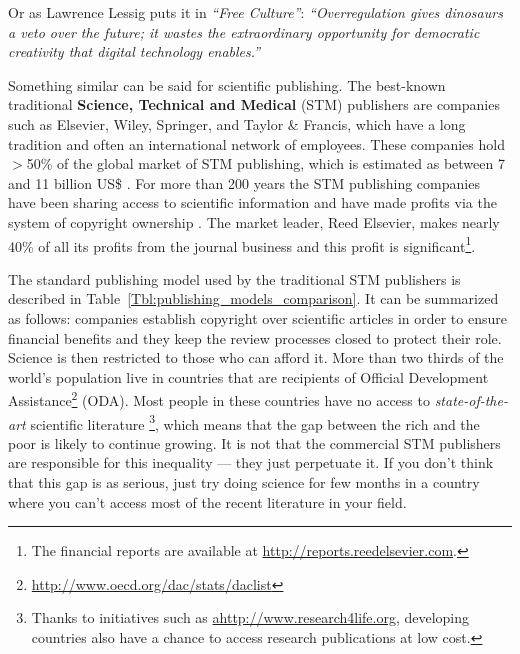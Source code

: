 \documentclass[graybox,envcountchap,sectrefs,UStrade]{svmono}
\begin{document}
Or as Lawrence Lessig puts it in \emph{``Free Culture''}: \emph{``Overregulation gives dinosaurs a veto over the future; it wastes the extraordinary opportunity for democratic creativity that digital technology enables.''}\par

Something similar can be said for scientific publishing. The best-known traditional \textbf{Science, Technical and Medical} (STM) publishers are companies such as Elsevier, Wiley, Springer, and Taylor \& Francis, which have a long tradition and often an international network of employees. These companies hold $>$50\% of the global market of STM publishing, which is estimated as between 7 and 11 billion US\$ \citep{ICU2006}. For more than 200 years the STM publishing companies have been sharing access to scientific information and have made profits via the system of copyright ownership \citep{Collins2005JACR}. The market leader, Reed Elsevier, makes nearly 40\% of all its profits from the journal business and this profit is significant\footnote{The financial reports are available at \url{http://reports.reedelsevier.com}.}.\par

The standard publishing model used by the traditional STM publishers is described in Table~\ref{Tbl:publishing_models_comparison}. It can be summarized as follows: companies establish copyright over scientific articles in order to ensure financial benefits and they keep the review processes closed to protect their role. Science is then restricted to those who can afford it. More than two thirds of the world's population live in countries that are recipients of Official Development Assistance\footnote{\url{http://www.oecd.org/dac/stats/daclist}} (ODA). Most people in these countries have no access to \emph{state-of-the-art} scientific literature \footnote{Thanks to initiatives such as \url{ahttp://www.research4life.org}, developing countries also have a chance to access research publications at low cost.}, which means that the gap between the rich and the poor is likely to continue growing. It is not that the commercial STM publishers are responsible for this inequality --- they just perpetuate it. If you don't think that this gap is as serious, just try doing science for few months in a country where you can't access most of the recent literature in your field. \par
\end{document}
